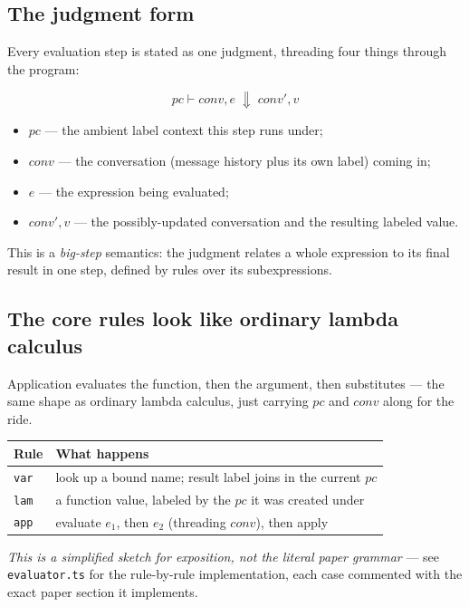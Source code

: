 \documentclass[11pt, a4paper]{article}
\newcommand{\bigstep}{\Downarrow}
\begin{document}
\begin{descirption}
{\subsection{The judgment form}

Every evaluation step is stated as one judgment, threading four things
through the program:

\[
pc \vdash \mathit{conv}, e \;\bigstep\; \mathit{conv}', v
\]

\begin{itemize}
  \item $pc$ --- the ambient label context this step runs under;
  \item $\mathit{conv}$ --- the conversation (message history plus its own
    label) coming in;
  \item $e$ --- the expression being evaluated;
  \item $\mathit{conv}', v$ --- the possibly-updated conversation and the
    resulting labeled value.
\end{itemize}

This is a \emph{big-step} semantics: the judgment relates a whole
expression to its final result in one step, defined by rules over its
subexpressions.

\subsection{The core rules look like ordinary lambda calculus}

Application evaluates the function, then the argument, then substitutes
--- the same shape as ordinary lambda calculus, just carrying $pc$ and
$\mathit{conv}$ along for the ride.

\begin{center}
\begin{tabular}{@{}ll@{}}
\toprule
Rule & What happens \\
\midrule
\texttt{var} & look up a bound name; result label joins in the current $pc$ \\
\texttt{lam} & a function value, labeled by the $pc$ it was created under \\
\texttt{app} & evaluate $e_1$, then $e_2$ (threading $\mathit{conv}$), then apply \\
\bottomrule
\end{tabular}
\end{center}

\emph{This is a simplified sketch for exposition, not the literal paper
grammar} --- see \texttt{evaluator.ts} for the rule-by-rule
implementation, each case commented with the exact paper section it
implements.

}
\end{descirption}
\end{document}
